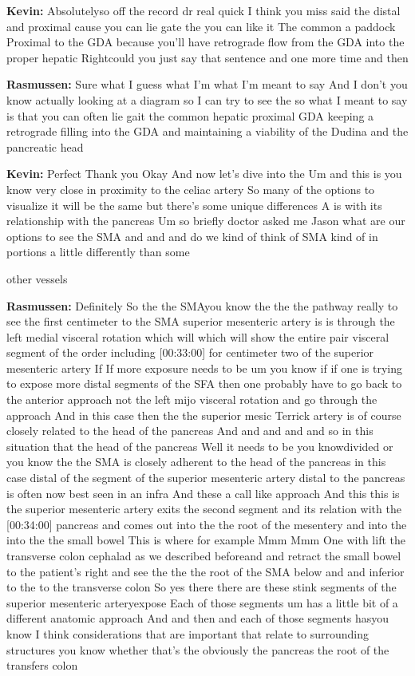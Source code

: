 \documentclass[
]{book}
\begin{document}
\textbf{Kevin:} Absolutelyso off the record dr real quick I think you miss
said the distal and proximal cause you can lie gate the you can like it
The common a paddock Proximal to the GDA because you'll have retrograde
flow from the GDA into the proper hepatic Rightcould you just say that
sentence and one more time and then

\textbf{Rasmussen:} Sure what I guess what I'm what I'm meant to say And I
don't you know actually looking at a diagram so I can try to see the so
what I meant to say is that you can often lie gait the common hepatic
proximal GDA keeping a retrograde filling into the GDA and maintaining a
viability of the Dudina and the pancreatic head

\textbf{Kevin:} Perfect Thank you Okay And now let's dive into the Um and
this is you know very close in proximity to the celiac artery So many of
the options to visualize it will be the same but there's some unique
differences A is with its relationship with the pancreas Um so briefly
doctor asked me Jason what are our options to see the SMA and and and do
we kind of think of SMA kind of in portions a little differently than
some

other vessels

\textbf{Rasmussen:} Definitely So the the SMAyou know the the the pathway
really to see the first centimeter to the SMA superior mesenteric artery
is is through the left medial visceral rotation which will which will
show the entire pair visceral segment of the order including {[}00:33:00{]}
for centimeter two of the superior mesenteric artery If If more exposure
needs to be um you know if if one is trying to expose more distal
segments of the SFA then one probably have to go back to the anterior
approach not the left mijo visceral rotation and go through the approach
And in this case then the the superior mesic Terrick artery is of course
closely related to the head of the pancreas And and and and and so in
this situation that the head of the pancreas Well it needs to be you
knowdivided or you know the the SMA is closely adherent to the head of
the pancreas in this case distal of the segment of the superior
mesenteric artery distal to the pancreas is often now best seen in an
infra And these a call like approach And this this is the superior
mesenteric artery exits the second segment and its relation with the
{[}00:34:00{]} pancreas and comes out into the the root of the mesentery and
into the into the the small bowel This is where for example Mmm Mmm One
with lift the transverse colon cephalad as we described beforeand and
retract the small bowel to the patient's right and see the the the root
of the SMA below and and inferior to the to the transverse colon So yes
there there are these stink segments of the superior mesenteric
arteryexpose Each of those segments um has a little bit of a different
anatomic approach And and then and each of those segments hasyou know I
think considerations that are important that relate to surrounding
structures you know whether that's the obviously the pancreas the root
of the transfers colon
\end{document}
